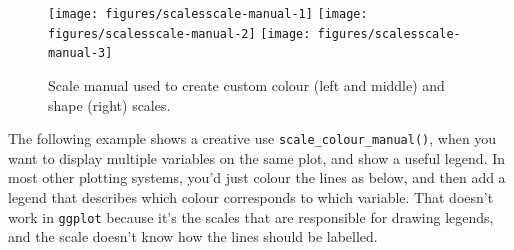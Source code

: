 \begin{Shaded}
\begin{Highlighting}[]
\StringTok{ }  \NormalTok{)}
\StringTok{ }\NormalTok{(} \StringTok{ }
\StringTok{  }\NormalTok{(} \NormalTok{(}\NormalTok{, }\NormalTok{, }\NormalTok{, }\NormalTok{))}
\StringTok{ }\NormalTok{(} \NormalTok{, } \NormalTok{, } \NormalTok{, } \NormalTok{)}
\StringTok{ }\NormalTok{(} \StringTok{ }\NormalTok{(} 
\StringTok{ }\NormalTok{(} \StringTok{ }
\StringTok{  }\NormalTok{(} \NormalTok{(}\NormalTok{, }\NormalTok{, }\NormalTok{, }\NormalTok{))}
\end{Highlighting}
\end{Shaded}

\begin{figure}

{\centering \texttt{[image: figures/scalesscale-manual-1]} \texttt{[image: figures/scalesscale-manual-2]} \texttt{[image: figures/scalesscale-manual-3]} 

}

\caption{Scale manual used to create custom colour (left and middle) and shape (right) scales.\label{fig:scale-manual}}
\end{figure}

The following example shows a creative use
\texttt{scale\_colour\_manual()}, when you want to display multiple
variables on the same plot, and show a useful legend. In most other
plotting systems, you'd just colour the lines as below, and then add a
legend that describes which colour corresponds to which variable. That
doesn't work in \texttt{ggplot} because it's the scales that are
responsible for drawing legends, and the scale doesn't know how the
lines should be labelled.


